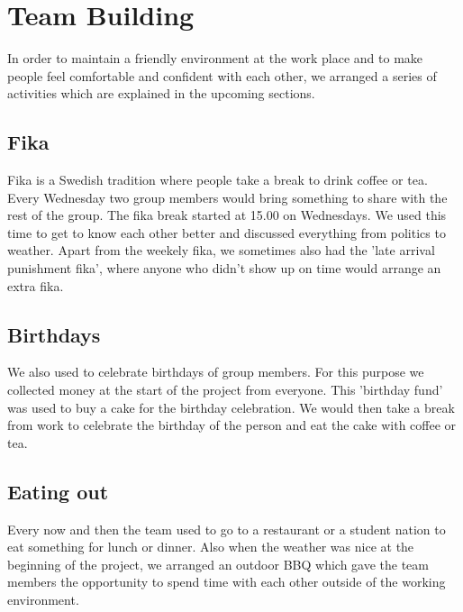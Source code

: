 \section{Team Building}

In order to maintain a friendly environment at the work place and to make people
feel comfortable and confident with each other, we arranged a series of activities
which are explained in the upcoming sections.

\subsection{Fika}
Fika is a Swedish tradition where people take a break to drink coffee or tea. Every Wednesday two group members would bring something to share with the rest of the group. The fika break started at 15.00 
on Wednesdays. We used this time to get to know each other better and discussed 
everything from politics to weather. Apart from the weekely fika, we sometimes also had the 'late arrival punishment fika',
where anyone who didn't show up on time would arrange an extra fika.

\subsection{Birthdays}
We also used to celebrate birthdays of group members. For this purpose we collected 
money at the start of the project from everyone. This 'birthday fund' was used to buy a cake for the birthday celebration. 
We would then take a break from work to celebrate the birthday of the person and eat the cake with coffee or tea. 

\subsection{Eating out}
Every now and then the team used to go to a restaurant or a student nation to eat something for lunch or dinner. Also when the weather 
was nice at the beginning of the project, we arranged an outdoor BBQ which gave the team members the opportunity to spend time with each
other outside of the working environment.
